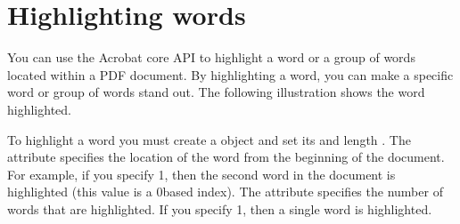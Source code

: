 \documentclass[letterpaper,12pt,english,openany,oneside]{sphinxmanual}
\begin{document}
\section{Highlighting words}
\label{\detokenize{Plugins_Words:highlighting-words}}
You can use the Acrobat core API to highlight a word or a group of words located within a PDF document. By highlighting a word, you can make a specific word or group of words stand out. The following illustration shows the word  highlighted.

\noindent{}

To highlight a word you must create a  object and set its  and length . The  attribute specifies the location of the word from the beginning of the document. For example, if you specify 1, then the second word in the document is highlighted (this value is a 0\sphinxhyphen{}based index). The  attribute specifies the number of words that are highlighted. If you specify 1, then a single word is highlighted.
\end{document}
